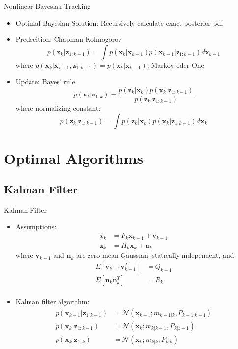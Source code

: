 \documentclass{beamer}
\begin{document}
\begin{frame}{Nonlinear Bayesian Tracking}%
  \begin{itemize}
  	\item{ Optimal Bayesian Solution: Recursively calculate exact posterior pdf
    }
  	\item{Predecition: Chapman-Kolmogorov
  	$$
  		p(\mathbf{x}_k|\mathbf{z}_{1:k-1}) = \int
  		p(\mathbf{x}_k|\mathbf{x}_{k-1}) p(\mathbf{x}	_{k-1}|\mathbf{z}_{1:k-1}) d\mathbf{x}_{k-1}
	$$
	where $p(\mathbf{x}_k|\mathbf{x}_{k-1}, \mathbf{z}_{1:k-1}) = p(\mathbf{x}_k|\mathbf{x}_{k-1})$: Markov oder One
    }
    \item{Update: Bayes' rule
    $$
		p(\mathbf{x}_k|\mathbf{z}_{1:k}) 
    	= \frac{{p(\mathbf{z}_{k}|\mathbf{x}_k)}	p(\mathbf{x}_k|\mathbf{z}_{1:k-1})}
		{{p(\mathbf{z}_{k}|\mathbf{z}_{1:k-1})}} 
	$$
	where normalizing constant:
	$$
		p(\mathbf{z}_k|\mathbf{z}_{1:k-1}) = \int
  		p(\mathbf{z}_k|\mathbf{x}_{k}) p(\mathbf{x}_{k}|			\mathbf{z}_{1:k-1}) d\mathbf{x}_{k}
  	$$
    }    
  \end{itemize}
\end{frame}    
\section{Optimal Algorithms}
\subsection{Kalman Filter}

\begin{frame}{Kalman Filter}%
  \begin{itemize}
  \item {Assumptions:    
    \begin{align*}
    \mathbf{}x_k &= F_k\mathbf{x}_{k-1} + \mathbf{v}_{k-1} \\
    \mathbf{z}_k &= H_k\mathbf{x}_k + \mathbf{n}_k
    \end{align*}
where $\mathbf{v}_{k-1}$ and $\mathbf{n}_k$ are zero-mean Gaussian, statically independent, and   
    \begin{align*}
        E[\mathbf{v}_{k-1}\mathbf{v}_{k-1}^T] &= Q_{k-1} \\
        E[\mathbf{n}_{k}\mathbf{n}_{k}^T] &= R_{k} \\
    \end{align*}
	}
	\item{ Kalman filter algorithm:
    \begin{align*}
    p(\mathbf{x}_{k-1}|\mathbf{z}_{1:k-1}) &= \mathcal{N}(\mathbf{x}_{k-1}; m_{k-1|k}, P_{k-1|k-1}) \\
    p(\mathbf{x}_{k}|\mathbf{z}_{1:k-1}) &= \mathcal{N}(\mathbf{x}_{k}; m_{k|k-1}, P_{k|k-1}) \\
    p(\mathbf{x}_k|\mathbf{z}_{1:k}) &= \mathcal{N}(\mathbf{x}_k; m_{k|k}, P_{k|k})
    \end{align*}
    }
  \end{itemize}
\end{frame}
\end{document}

